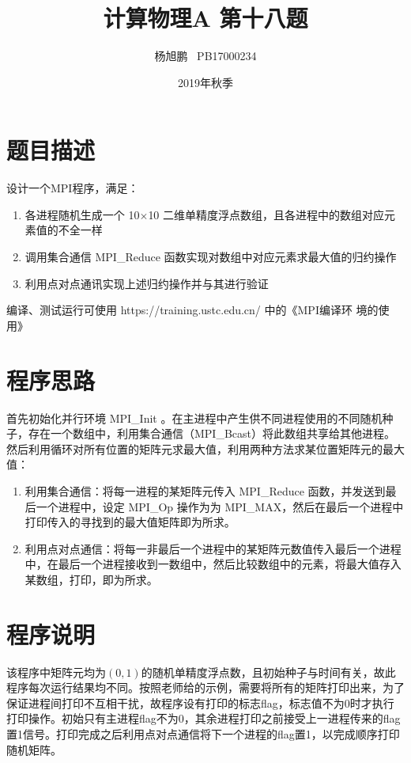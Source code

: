 \documentclass[a4paper,11pt]{article}
\author{ 杨旭鹏  \  PB17000234}
\date{2019年秋季}
\title{计算物理A 第十八题}
\begin{document}
\maketitle

\section{题目描述}
设计一个MPI程序，满足：
\begin{enumerate}
	\item 各进程随机生成一个 10$\times$10 二维单精度浮点数组，且各进程中的数组对应元素值的不全一样 
	\item 调用集合通信 MPI\_Reduce 函数实现对数组中对应元素求最大值的归约操作
	\item 利用点对点通讯实现上述归约操作并与其进行验证
\end{enumerate}

编译、测试运行可使用 https://training.ustc.edu.cn/ 中的《MPI编译环 境的使用》

\section{程序思路}
首先初始化并行环境 MPI\_Init 。在主进程中产生供不同进程使用的不同随机种子，存在一个数组中，利用集合通信（MPI\_Bcast）将此数组共享给其他进程。然后利用循环对所有位置的矩阵元求最大值，利用两种方法求某位置矩阵元的最大值：
\begin{enumerate}
	\item 利用集合通信：将每一进程的某矩阵元传入 MPI\_Reduce 函数，并发送到最后一个进程中，设定 MPI\_Op 操作为为 MPI\_MAX，然后在最后一个进程中打印传入的寻找到的最大值矩阵即为所求。
	\item 利用点对点通信：将每一非最后一个进程中的某矩阵元数值传入最后一个进程中，在最后一个进程接收到一数组中，然后比较数组中的元素，将最大值存入某数组，打印，即为所求。
\end{enumerate}

\section{程序说明}
该程序中矩阵元均为$(0,1)$的随机单精度浮点数，且初始种子与时间有关，故此程序每次运行结果均不同。按照老师给的示例，需要将所有的矩阵打印出来，为了保证进程间打印不互相干扰，故程序设有打印的标志flag，标志值不为0时才执行打印操作。初始只有主进程flag不为0，其余进程打印之前接受上一进程传来的flag置1信号。打印完成之后利用点对点通信将下一个进程的flag置1，以完成顺序打印随机矩阵。
\end{document}
